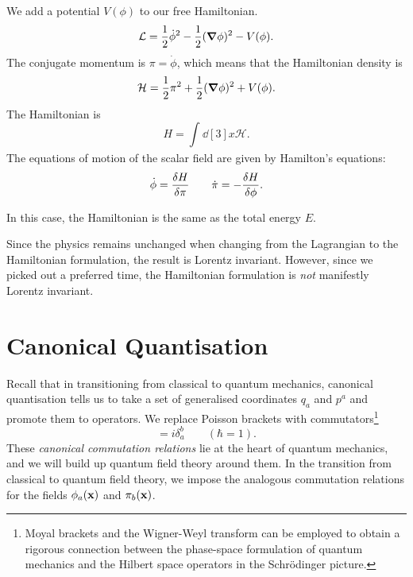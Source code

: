 \begin{example}
  We add a potential $V(\phi)$ to our free Hamiltonian.
  \begin{equation}
    \mathcal{L} =  \frac{1}{2}\dot \phi^2 - \frac{1}{2}(\grad \phi)^2 - V(\phi).
  \end{equation}
  The conjugate momentum is $\pi = \dot \phi$, which means that the Hamiltonian density is
  \begin{equation}
    \mathcal{H} = \frac{1}{2}\pi^2 + \frac{1}{2}(\grad \phi)^2 + V(\phi).
  \end{equation}
  The Hamiltonian is
  \begin{equation}
    H = \int_{}^{} \dd[3]{x} \mathcal{H}.
  \end{equation}
  The equations of motion of the scalar field are given by Hamilton's equations:
  \begin{equation}
    \dot \phi = \fdv{H}{\pi} \qquad \dot \pi = -\fdv{H}{\phi}.
  \end{equation}

  \begin{leftbar}
    \begin{remark}
      In this case, the Hamiltonian is the same as the total energy $E$.
    \end{remark}
  \end{leftbar}
\end{example}

Since the physics remains unchanged when changing from the Lagrangian to the Hamiltonian formulation, the result is Lorentz invariant. However, since we picked out a preferred time, the Hamiltonian formulation is \emph{not} manifestly Lorentz invariant.

\section{Canonical Quantisation}%
\label{sec:canonical_quantisation}

Recall that in transitioning from classical to quantum mechanics, canonical quantisation tells us to take a set of generalised coordinates $q_a$ and $p^a$ and promote them to operators. We replace Poisson brackets with commutators\footnote{Moyal brackets and the Wigner-Weyl transform can be employed to obtain a rigorous connection between the phase-space formulation of quantum mechanics and the Hilbert space operators in the Schr\"odinger picture.}
\begin{equation}
  [q_a, p^b] = i \delta_a^b \qquad (\hbar = 1).
\end{equation}
These \emph{canonical commutation relations} lie at the heart of quantum mechanics, and we will build up quantum field theory around them.
In the transition from classical to quantum field theory, we impose the analogous commutation relations for the fields $\phi_a(\vb{x})$ and $\pi_b(\vb{x})$.

